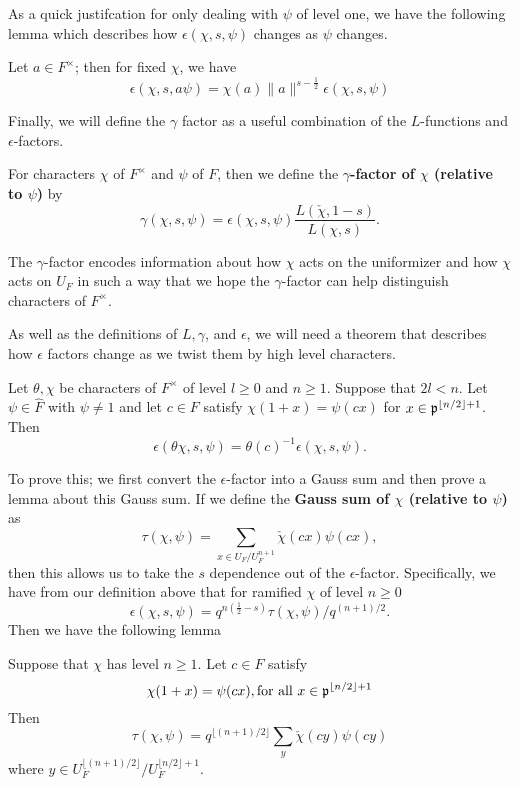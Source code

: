 As a quick justifcation for only dealing with $\psi$ of level one, we have the following lemma which describes how $\epsilon(\chi, s, \psi)$ changes as $\psi$ changes.
\label{lem:level-one-psi-reduction}
\begin{lemma}
  Let $a \in F^\times$; then for fixed $\chi$, we have
  \[\epsilon ( \chi, s, a \psi) = \chi(a) \| a \|^{s - \frac{1}{2}} \epsilon (\chi, s, \psi)\]
\end{lemma}

Finally, we will define the $\gamma$ factor as a useful combination of the $L$-functions and $\epsilon$-factors.
\begin{defn}
  For characters $\chi$ of $F^\times$ and $\psi$ of $F$, then we define the \textbf{$\gamma$-factor of $\chi$ (relative to $\psi$)} by
  \[\gamma(\chi, s, \psi) = \epsilon(\chi, s, \psi) \frac{L(\check{\chi}, 1-s)}{L(\chi,s)}.\]
\end{defn}
The $\gamma$-factor encodes information about how $\chi$ acts on the uniformizer and how $\chi$ acts on $U_F$ in such a way that we hope the $\gamma$-factor can help distinguish characters of $F^\times$.


As well as the definitions of $L, \gamma$, and $\epsilon$, we will need a theorem that describes how $\epsilon$ factors change as we twist them by high level characters.
\label{thm:Stability}
\begin{theorem}
  Let $\theta, \chi$ be characters of $F^\times$ of level $ l \geq 0$ and $n \geq 1$.
  Suppose that $2l < n$.
  Let $\psi \in \hat{F}$ with $\psi \neq 1$ and let $c \in F$ satisfy $\chi(1+x) = \psi(cx)$ for $x \in \mathfrak{p}^{\lfloor n/2 \rfloor + 1}$.
  Then
  \[ \epsilon(\theta \chi, s, \psi) = \theta(c)^{-1} \epsilon(\chi, s, \psi).\]
\end{theorem}

To prove this; we first convert the $\epsilon$-factor into a Gauss sum and then prove a lemma about this Gauss sum.
If we define the \textbf{Gauss sum of $\chi$ (relative to $\psi$)} as
\[\tau(\chi, \psi) = \sum_{x \in U_F/U_F^{n+1}} \check{\chi}(cx) \psi(cx),\]
then this allows us to take the $s$ dependence out of the $\epsilon$-factor.
Specifically, we have from our definition above that for ramified $\chi$ of level $n \geq 0$
\[\epsilon(\chi, s, \psi) = q^{n(\frac{1}{2} - s)} \tau(\chi, \psi)/ q^{(n+1)/2}.\]
Then we have the following lemma
\label{lem:Gauss-sum-reduction}
\begin{lemma}
  Suppose that $\chi$ has level $n \geq 1$.
  Let $c \in F$ satisfy
  \[ \chi(1 +x) = \psi(cx), \textrm{for all } x\in \mathfrak{p}^{\lfloor n/2 \rfloor + 1}\]
  Then
  \[\tau(\chi, \psi) = q^{\lfloor (n+1)/2 \rfloor} \sum_y \check{\chi}(cy) \psi(cy)\]
  where $y \in U_F^{\lfloor (n+1)/2 \rfloor} / U_F^{\lfloor n/2 \rfloor + 1}$.
\end{lemma}

